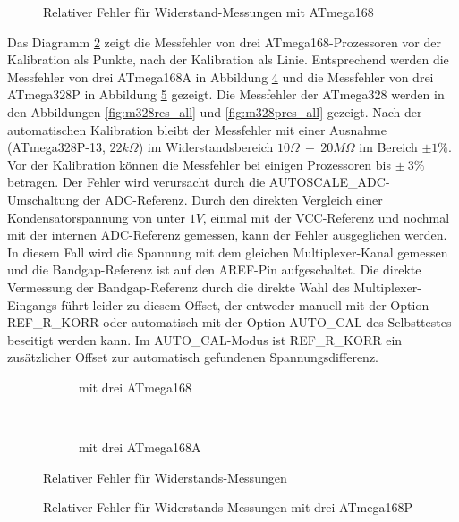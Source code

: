 \begin{figure}[H]
\centering

\caption{Relativer Fehler für Widerstand-Messungen mit ATmega168 }
\label{fig:mega168res}
\end{figure}

Das Diagramm \ref{fig:m168res_all} zeigt die Messfehler von drei ATmega168-Prozessoren vor der Kalibration als Punkte, nach der
Kalibration als Linie. Entsprechend werden die Messfehler von drei ATmega168A in Abbildung \ref{fig:m168ares_all} und
die Messfehler von drei ATmega328P in Abbildung \ref{fig:m168pres_all} gezeigt.
Die Messfehler der ATmega328 werden in den Abbildungen \ref{fig:m328res_all} und \ref{fig:m328pres_all} gezeigt.
Nach der automatischen Kalibration bleibt der Messfehler mit einer Ausnahme (ATmega328P-13, \(22k\Omega\)) im Widerstandsbereich
\(10\Omega~-~20M\Omega\) im Bereich \(\pm1\%\).
Vor der Kalibration können die Messfehler bei einigen Prozessoren bis \(\pm~3\%\) betragen.
Der Fehler wird verursacht durch die AUTOSCALE\_ADC-Umschaltung der ADC-Referenz.
Durch den direkten Vergleich einer Kondensatorspannung von unter \(1V\), einmal mit der VCC-Referenz und nochmal mit
der internen ADC-Referenz gemessen, kann der Fehler ausgeglichen werden.
In diesem Fall wird die Spannung mit dem gleichen Multiplexer-Kanal gemessen und die Bandgap-Referenz ist auf den AREF-Pin
aufgeschaltet.
Die direkte Vermessung der Bandgap-Referenz durch die direkte Wahl des Multiplexer-Eingangs führt leider zu diesem Offset,
der entweder manuell mit der Option REF\_R\_KORR oder automatisch mit der Option AUTO\_CAL des Selbsttestes beseitigt werden kann.
Im AUTO\_CAL-Modus ist REF\_R\_KORR ein zusätzlicher Offset zur automatisch gefundenen Spannungsdifferenz.

\begin{figure}[H]
  \begin{subfigure}[b]{9cm}
    \centering
    \resizebox{9cm}{!}{}
    \caption{mit drei ATmega168}
    \label{fig:m168res_all}
  \end{subfigure}
  ~
  \begin{subfigure}[b]{9cm}
    \centering
    \resizebox{9cm}{!}{}
    \caption{mit drei ATmega168A}
    \label{fig:m168ares_all}
  \end{subfigure}
\caption{Relativer Fehler für Widerstands-Messungen}
\end{figure}

\begin{figure}[H]
\centering

\caption{Relativer Fehler für Widerstands-Messungen mit drei ATmega168P }
\label{fig:m168pres_all}
\end{figure}


